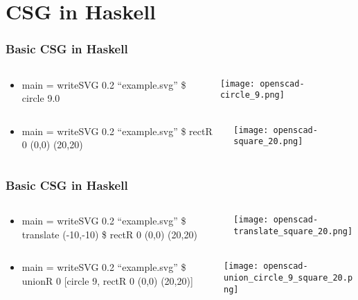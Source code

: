 \documentclass{beamer}
\begin{document}
\section{CSG in Haskell}

\begin{frame}
\frametitle{Basic CSG in Haskell}
\begin{columns}
  \begin{column}{0.5\textwidth}
    \begin{itemize}
    \item main = writeSVG 0.2 ``example.svg'' \$ circle 9.0
    \end{itemize}
  \end{column}
  \begin{column}{0.5\textwidth}
    \texttt{[image: openscad-circle\_9.png]}
  \end{column}
\end{columns}
\begin{columns}
  \begin{column}{0.5\textwidth}
    \begin{itemize}
    \item main = writeSVG 0.2 ``example.svg'' \$ rectR 0 (0,0) (20,20)
    \end{itemize}
  \end{column}
  \begin{column}{0.5\textwidth}
    \texttt{[image: openscad-square\_20.png]}
  \end{column}
\end{columns}
\end{frame}

\begin{frame}
\frametitle{Basic CSG in Haskell}
\begin{columns}
  \begin{column}{0.5\textwidth}
    \begin{itemize}
    \item main = writeSVG 0.2 ``example.svg'' \$ translate (-10,-10) \$ rectR 0 (0,0) (20,20)
    \end{itemize}
  \end{column}
  \begin{column}{0.5\textwidth}
    \texttt{[image: openscad-translate\_square\_20.png]}
  \end{column}
\end{columns}
\begin{columns}
  \begin{column}{0.5\textwidth}
    \begin{itemize}
    \item main = writeSVG 0.2 ``example.svg'' \$ unionR 0 [circle 9, rectR 0 (0,0) (20,20)]
    \end{itemize}
  \end{column}
  \begin{column}{0.5\textwidth}
    \texttt{[image: openscad-union\_circle\_9\_square\_20.png]}
  \end{column}
\end{columns}
\end{frame}
\end{document}
